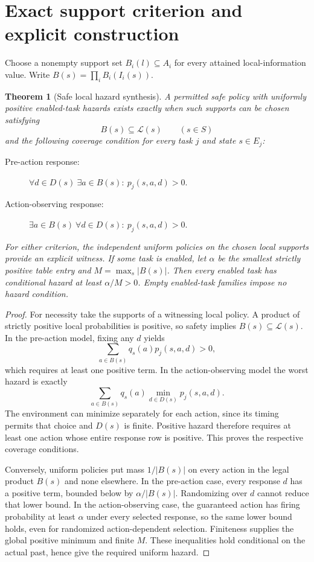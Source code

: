 \documentclass[11pt]{article}
\newtheorem{theorem}{Theorem}\newtheorem{proposition}{Proposition}
\begin{document}
\section{Exact support criterion and explicit construction}
Choose a nonempty support set $B_i(l)\subseteq A_i$ for every attained local-information value. Write $B(s)=\prod_iB_i(I_i(s))$.

\begin{theorem}[Safe local hazard synthesis]\label{sup-synth}
A permitted safe policy with uniformly positive enabled-task hazards exists exactly when such supports can be chosen satisfying
\[
 B(s)\subseteq\mathcal L(s)\qquad(s\in S)
\]
and the following coverage condition for every task $j$ and state $s\in E_j$:
\begin{description}
\item[Pre-action response:]
$\displaystyle\forall d\in D(s)\ \exists a\in B(s):\ p_j(s,a,d)>0.$
\item[Action-observing response:]
$\displaystyle\exists a\in B(s)\ \forall d\in D(s):\ p_j(s,a,d)>0.$
\end{description}
For either criterion, the independent uniform policies on the chosen local supports provide an explicit witness. If some task is enabled, let $\alpha$ be the smallest strictly positive table entry and $M=\max_s|B(s)|$. Then every enabled task has conditional hazard at least $\alpha/M>0$. Empty enabled-task families impose no hazard condition.
\end{theorem}
\begin{proof}
For necessity take the supports of a witnessing local policy. A product of strictly positive local probabilities is positive, so safety implies $B(s)\subseteq\mathcal L(s)$. In the pre-action model, fixing any $d$ yields
\[
 \sum_{a\in B(s)}q_s(a)p_j(s,a,d)>0,
\]
which requires at least one positive term. In the action-observing model the worst hazard is exactly
\[
 \sum_{a\in B(s)}q_s(a)\min_{d\in D(s)}p_j(s,a,d).
\]
The environment can minimize separately for each action, since its timing permits that choice and $D(s)$ is finite. Positive hazard therefore requires at least one action whose entire response row is positive. This proves the respective coverage conditions.

Conversely, uniform policies put mass $1/|B(s)|$ on every action in the legal product $B(s)$ and none elsewhere. In the pre-action case, every response $d$ has a positive term, bounded below by $\alpha/|B(s)|$. Randomizing over $d$ cannot reduce that lower bound. In the action-observing case, the guaranteed action has firing probability at least $\alpha$ under every selected response, so the same lower bound holds, even for randomized action-dependent selection. Finiteness supplies the global positive minimum and finite $M$. These inequalities hold conditional on the actual past, hence give the required uniform hazard.
\end{proof}
\end{document}
